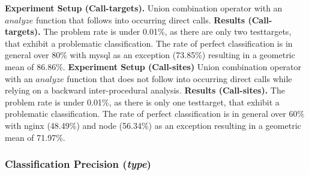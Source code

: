 \textbf{Experiment Setup (Call-targets).} Union combination operator with an $analyze$ function that follows into occurring direct calls.
\textbf{Results (Call-targets).} The problem rate is under 0.01\%, as there are only two testtargets, that exhibit a problematic classification. The rate of perfect classification is in general over 80\% with mysql as an exception (73.85\%) resulting in a geometric mean of 86.86\%.
\textbf{Experiment Setup (Call-sites)} Union combination operator with an $analyze$ function that does not follow into occurring direct calls while relying on a backward inter-procedural analysis.
\textbf{Results (Call-sites).} The problem rate is under 0.01\%, as there is only one testtarget, that exhibit a problematic classification. The rate of perfect classification is in general over 60\% with nginx (48.49\%) and node (56.34\%) as an exception resulting in a geometric mean of 71.97\%.


\subsubsection{Classification Precision (\textit{type})}
\label{subsection:typeshieldcountprecision}

